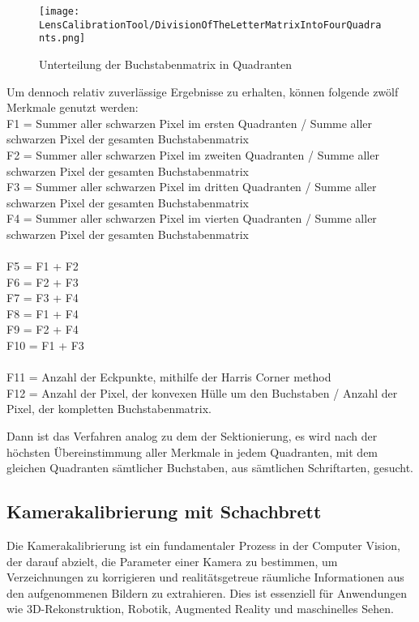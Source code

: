 \begin{figure}
    \centering
    \texttt{[image: LensCalibrationTool/DivisionOfTheLetterMatrixIntoFourQuadrants.png]}
    \caption{Unterteilung der Buchstabenmatrix in Quadranten}
    \label{fig:Unterteilung der Buchstabenmatrix in Quadranten}
\end{figure}
{Um dennoch relativ zuverlässige Ergebnisse zu erhalten, können folgende zwölf Merkmale genutzt werden:\\
    F1 = Summer aller schwarzen Pixel im ersten Quadranten / Summe aller schwarzen Pixel der gesamten Buchstabenmatrix\\
    
    F2 = Summer aller schwarzen Pixel im zweiten Quadranten / Summe aller schwarzen Pixel der gesamten Buchstabenmatrix\\
    F3 = Summer aller schwarzen Pixel im dritten Quadranten / Summe aller schwarzen Pixel der gesamten Buchstabenmatrix\\
    F4 = Summer aller schwarzen Pixel im vierten Quadranten / Summe aller schwarzen Pixel der gesamten Buchstabenmatrix\\
    \\
    F5 = F1 + F2 \\F6 = F2 + F3\\ F7 = F3 + F4\\ F8 = F1 + F4\\ F9 = F2 + F4\\ F10 = F1 + F3\\
    \\
    F11 = Anzahl der Eckpunkte, mithilfe der Harris Corner method\\
    F12 = Anzahl der Pixel, der konvexen Hülle um den Buchstaben / Anzahl der Pixel, der kompletten Buchstabenmatrix. \cite{Jana:2014}
    
    
    
    Dann ist das Verfahren analog zu dem der Sektionierung, es wird nach der höchsten Übereinstimmung aller Merkmale in jedem Quadranten, mit dem gleichen Quadranten sämtlicher Buchstaben, aus sämtlichen Schriftarten, gesucht.
    
    
    \newpage
    \subsection{Kamerakalibrierung mit Schachbrett}
    {Die Kamerakalibrierung ist ein fundamentaler Prozess in der Computer Vision, der darauf abzielt, die Parameter einer Kamera zu bestimmen, um Verzeichnungen zu korrigieren und realitätsgetreue räumliche Informationen aus den aufgenommenen Bildern zu extrahieren. Dies ist essenziell für Anwendungen wie 3D-Rekonstruktion, Robotik, Augmented Reality und maschinelles Sehen.
    }
    
}
